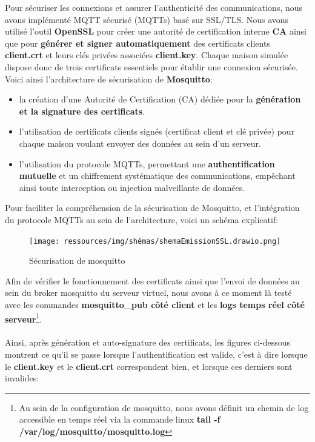 \documentclass[10pt, a4paper]{report}
\begin{document}
	Pour sécuriser les connexions et assurer l'authenticité des communications, nous avons implémenté MQTT sécurisé (MQTTs) basé sur SSL/TLS. Nous avons utilisé l’outil \textbf{OpenSSL} pour créer une autorité de certification interne \textbf{CA} ainsi que pour \textbf{générer et signer automatiquement} des certificats clients \textbf{client.crt} et leurs clés privées associées \textbf{client.key}. Chaque maison simulée dispose donc de trois certificats essentiels pour établir une connexion sécurisée.\\
	
	Voici ainsi l'architecture de sécurisation de \textbf{Mosquitto}:
	\begin{itemize}
		 \item la création d'une Autorité de Certification (CA) dédiée pour la \textbf{génération et la signature des certificats}.
		\item l'utilisation de certificats clients signés (certificat client et clé privée) pour chaque maison voulant envoyer des données au sein d'un serveur.
		\item l'utilisation du protocole MQTTs, permettant une \textbf{authentification mutuelle} et un chiffrement systématique des communications, empêchant ainsi toute interception ou injection malveillante de données.
	\end{itemize}
	
	\vspace{1cm}
	
	Pour faciliter la compréhension de la sécurisation de Mosquitto, et l'intégration du protocole MQTTs au sein de l'architecture, voici un schéma explicatif: 
	\begin{figure}[h!]
		\centering
		\texttt{[image: ressources/img/shémas/shemaEmissionSSL.drawio.png]}
		\caption{Sécurisation de mosquitto}
		\label{fig:secuMosquitto}
	\end{figure}
	
	Afin de vérifier le fonctionnement des certificats ainsi que l'envoi de données au sein du broker mosquitto du serveur virtuel, nous avons à ce moment là testé avec les commandes \textbf{mosquitto\_pub côté client} et les \textbf{logs temps réel côté serveur}\footnote{Au sein de la configuration de mosquitto, nous avons définit un chemin de log accessible en temps réel via la commande linux \textbf{tail -f /var/log/mosquitto/mosquitto.log}}.\\\\ Ainsi, après génération et auto-signature des certificats, les figures ci-dessous montrent ce qu'il se passe lorsque l'authentification est valide, c'est à dire lorsque le \textbf{client.key} et le \textbf{client.crt} correspondent bien, et lorsque ces derniers sont invalides:
	
\end{document}
